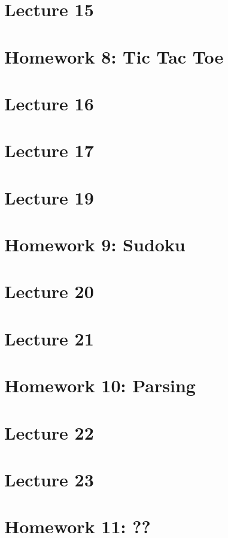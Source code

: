 \documentclass{book}
\begin{document}
\chapter{Lecture 15}

\chapter{Homework 8: Tic Tac Toe}

\chapter{Lecture 16}

\chapter{Lecture 17}

\chapter{Lecture 19}

\chapter{Homework 9: Sudoku}

\chapter{Lecture 20}

\chapter{Lecture 21}

\chapter{Homework 10: Parsing}

\chapter{Lecture 22}

\chapter{Lecture 23}

\chapter{Homework 11: ??}
\end{document}
